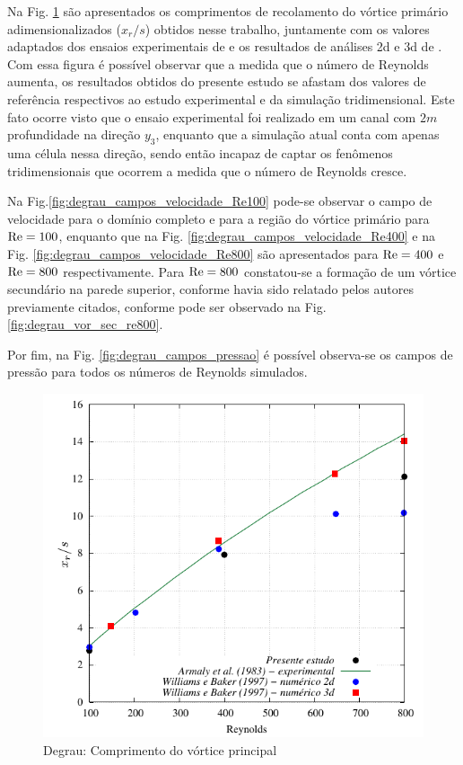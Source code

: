 \documentclass[tese_patricia]{subfiles}
\begin{document}
Na Fig. \ref{fig:degrau_comprimento_vortice_principal} são apresentados os comprimentos de recolamento do vórtice primário adimensionalizados ($x_{r}/s$) obtidos nesse trabalho, juntamente com os valores adaptados dos ensaios experimentais de  e os resultados de análises 2d e 3d de . Com essa figura é possível observar que a medida que o número de Reynolds aumenta, os resultados obtidos do presente estudo se afastam dos valores de referência respectivos ao estudo experimental e da simulação tridimensional. Este fato ocorre visto que o ensaio experimental foi realizado em um canal com $2m$ profundidade na direção $y_3$, enquanto que a simulação atual conta com apenas uma célula nessa direção, sendo então incapaz de captar os fenômenos tridimensionais que ocorrem a medida que o número de Reynolds cresce. 

Na Fig.\ref {fig:degrau_campos_velocidade_Re100} pode-se observar o campo de velocidade para o domínio completo e para a região do vórtice primário para $\mathrm{Re} = 100$, enquanto que na Fig. \ref {fig:degrau_campos_velocidade_Re400} e na Fig. \ref {fig:degrau_campos_velocidade_Re800} são apresentados para $\mathrm{Re} = 400$ e $\mathrm{Re} = 800$ respectivamente. Para $\mathrm{Re} = 800$ constatou-se a formação de um vórtice secundário na parede superior, conforme havia sido relatado pelos autores previamente citados, conforme pode ser observado na Fig. \ref{fig:degrau_vor_sec_re800}.

Por fim, na Fig. \ref{fig:degrau_campos_pressao} é possível observa-se os campos de pressão para todos os números de Reynolds simulados.

\begin{figure}[htb!]
	\centering
	\includegraphics[scale=1.2,trim=0cm 0cm 0cm 0cm, clip=true]{Imagens/Cap3/degrau_vort_prim.pdf}
	\caption{Degrau: Comprimento do vórtice principal}
	\label{fig:degrau_comprimento_vortice_principal}
\end{figure}
\end{document}
